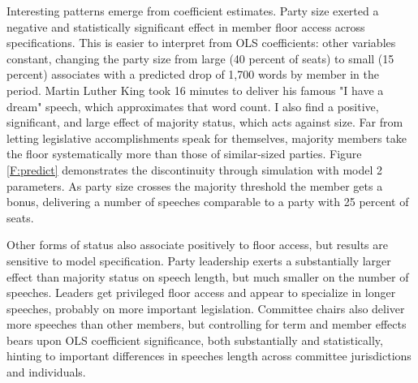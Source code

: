 \documentclass[letter,12pt]{article}
\begin{document}


Interesting patterns emerge from coefficient estimates. Party size exerted a negative and statistically significant effect in member floor access across specifications. This is easier to interpret from OLS coefficients: other variables constant, changing the party size from large (40 percent of seats) to small (15 percent) associates with a predicted drop of 1,700 words by member in the period. Martin Luther King took 16 minutes to deliver his famous "I have a dream" speech, which approximates that word count. I also find a positive, significant, and large effect of majority status, which acts against size. Far from letting legislative accomplishments speak for themselves, majority members take the floor systematically more than those of similar-sized parties. Figure \ref{F:predict} demonstrates the discontinuity through simulation with model 2 parameters. As party size crosses the majority threshold the member gets a bonus, delivering a number of speeches comparable to a party with 25 percent of seats.


Other forms of status also associate positively to floor access, but results are sensitive to model specification. Party leadership exerts a substantially larger effect than majority status on speech length, but much smaller on the number of speeches. Leaders get privileged floor access and appear to specialize in longer speeches, probably on more important legislation. Committee chairs also deliver more speeches than other members, but controlling for term and member effects bears upon OLS coefficient significance, both substantially and statistically, hinting to important differences in speeches length across committee jurisdictions and individuals.
\end{document}
